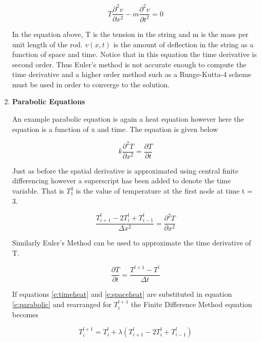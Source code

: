 \begin{enumerate}
    \begin{equation}
      T \frac{\partial^2 v}{\partial x^2} - m \frac{\partial^2
        v}{\partial t^2} = 0
    \end{equation}

    In the equation above, T is the tension in the string and m is the mass per unit
    length of the rod. $v(x,t)$ is the amount of deflection in the
    string as a function of space and time. Notice that in this
    equation the time derivative is second order. Thus Euler's method
    is not accurate enough to compute the time derivative and a higher
    order method such as a Runge-Kutta-4 scheme must be used in order
    to converge to the solution.

  \item {\bf Parabolic Equations}

    An example parabolic equation is again a heat equation however
    here the equation is a function of x and time. The equation is
    given below

    \begin{equation}\label{e:parabolic}
      k\frac{\partial^2 T}{\partial x^2} = \frac{\partial T}{\partial t}
    \end{equation}

    Just as before the spatial derivative is approximated using
    central finite differencing however a superscript has been added
    to denote the time variable. That is $T_{1}^3$ is the value of
    temperature at the first node at time t = 3.

    \begin{equation}\label{e:spaceheat}
      \frac{T_{i+1}^l - 2T_{i}^l + T_{i-1}^l}{\Delta x^2} =
      \frac{\partial^2 T}{\partial x^2}
    \end{equation}

    Similarly Euler's Method can be used to approximate the time
    derivative of T.

    \begin{equation}\label{e:timeheat}
      \frac{\partial T}{\partial t} = \frac{T^{l+1}-T^l}{\Delta t}
    \end{equation}

    If equations \ref{e:timeheat} and \ref{e:spaceheat} are
    substituted in equation \ref{e:parabolic} and rearranged for
    $T_i^{l+1}$ the Finite Difference Method equation becomes    

    \begin{equation}
      T_i^{l+1} = T_i^l + \lambda (T_{i+1}^l - 2T_i^l + T_{i-1}^l)
    \end{equation}


\end{enumerate}
